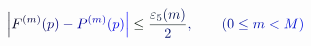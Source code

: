 \documentclass[12pt]{article}
\begin{document}
\makeatletter
\renewcommand*{\@textcolor}[3]{%
  \protect\leavevmode
  \begingroup
    \color#1{#2}#3%
  \endgroup
}
\makeatother
\begin{displaymath}
\mathcolor[RGB]{0,0,15}{\Bigl|} \mathcolor[RGB]{0,0,30}{F} ^ { \mathcolor[RGB]{0,0,45}{(} \mathcolor[RGB]{0,0,60}{m} \mathcolor[RGB]{0,0,75}{)} } \mathcolor[RGB]{0,0,90}{(} \mathcolor[RGB]{0,0,105}{p} \mathcolor[RGB]{0,0,120}{)} \mathcolor[RGB]{0,0,135}{-} \mathcolor[RGB]{0,0,150}{P} ^ { \mathcolor[RGB]{0,0,165}{(} \mathcolor[RGB]{0,0,180}{m} \mathcolor[RGB]{0,0,195}{)} } \mathcolor[RGB]{0,0,210}{(} \mathcolor[RGB]{0,0,225}{p} \mathcolor[RGB]{0,0,240}{)} \mathcolor[RGB]{0,0,255}{\Bigr|} \mathcolor[RGB]{0,15,0}{\le} \mathcolor[RGB]{0,15,15}{\frac { \mathcolor[RGB]{0,15,30}{\varepsilon} _ { \mathcolor[RGB]{0,15,45}{5} } \mathcolor[RGB]{0,15,60}{(} \mathcolor[RGB]{0,15,75}{m} \mathcolor[RGB]{0,15,90}{)} } { \mathcolor[RGB]{0,15,105}{2} } } \mathcolor[RGB]{0,15,120}{,} \qquad \mathcolor[RGB]{0,15,135}{(} \mathcolor[RGB]{0,15,150}{0} \mathcolor[RGB]{0,15,165}{\le} \mathcolor[RGB]{0,15,180}{m} \mathcolor[RGB]{0,15,195}{<} \mathcolor[RGB]{0,15,210}{M} \mathcolor[RGB]{0,15,225}{)}
\end{displaymath}
\end{document}
